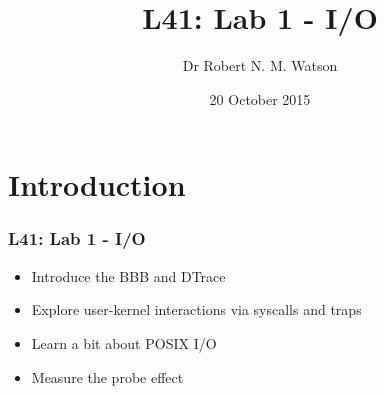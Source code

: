 
{
}

\usepackage[english]{babel}
\usepackage[latin1]{inputenc}
\usepackage{graphicx}
\usepackage{times}
\usepackage[T1]{fontenc}
\usepackage{fancyvrb}
\usepackage{hyperref}
\usepackage{listings}


\title{L41: Lab 1 - I/O}
\author{Dr Robert N. M. Watson}
\date{20 October 2015}

\begin{frame}
  \titlepage
\end{frame}

\section{Introduction}

\begin{frame}
  \frametitle{L41: Lab 1 - I/O}

  \begin{itemize}
    \item Introduce the BBB and DTrace
    \item Explore user-kernel interactions via syscalls and traps
    \item Learn a bit about POSIX I/O
    \item Measure the probe effect
  \end{itemize}
\end{frame}

